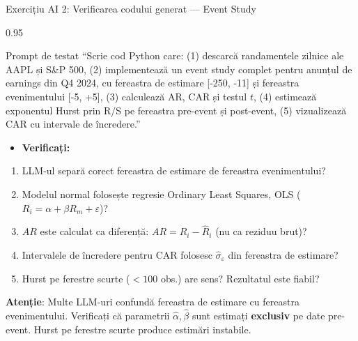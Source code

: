 \documentclass[9pt, aspectratio=169, t]{beamer}
\begin{document}
\begin{frame}{Exercițiu AI 2: Verificarea codului generat --- Event Study}
\begin{cminipage}{0.95\textwidth}
    \vspace{-3mm}
    \begin{block}{\footnotesize Prompt de testat}
        {\footnotesize
        ``Scrie cod Python care: (1) descarcă randamentele zilnice ale AAPL și S\&P 500, (2) implementează un event study complet pentru anunțul de earnings din Q4 2024, cu fereastra de estimare [-250, -11] și fereastra evenimentului [-5, +5], (3) calculează AR, CAR și testul $t$, (4) estimează exponentul Hurst prin R/S pe fereastra pre-event și post-event, (5) vizualizează CAR cu intervale de încredere.''
        }
    \end{block}
    \vspace{-2mm}
    {\footnotesize
    \begin{itemize}\setlength{\itemsep}{0pt}
        \item \textbf{Verificați:}
    \end{itemize}
    \begin{enumerate}\setlength{\itemsep}{0pt}
        \item LLM-ul separă corect fereastra de estimare de fereastra evenimentului?
        \item Modelul normal folosește regresie Ordinary Least Squares, OLS ($R_i = \alpha + \beta R_m + \varepsilon$)?
        \item $AR$ este calculat ca diferență: $AR = R_i - \hat{R}_i$ (nu ca reziduu brut)?
        \item Intervalele de încredere pentru CAR folosesc $\hat\sigma_\varepsilon$ din fereastra de estimare?
        \item Hurst pe ferestre scurte ($<100$ obs.) are sens? Rezultatul este fiabil?
    \end{enumerate}
    }
    \vspace{-2mm}
    \begin{alertblock}{}
        {\footnotesize \textbf{Atenție}: Multe LLM-uri confundă fereastra de estimare cu fereastra evenimentului. Verificați că parametrii $\hat\alpha, \hat\beta$ sunt estimați \textbf{exclusiv} pe date pre-event. Hurst pe ferestre scurte produce estimări instabile.}
    \end{alertblock}
\end{cminipage}
\end{frame}
\end{document}
